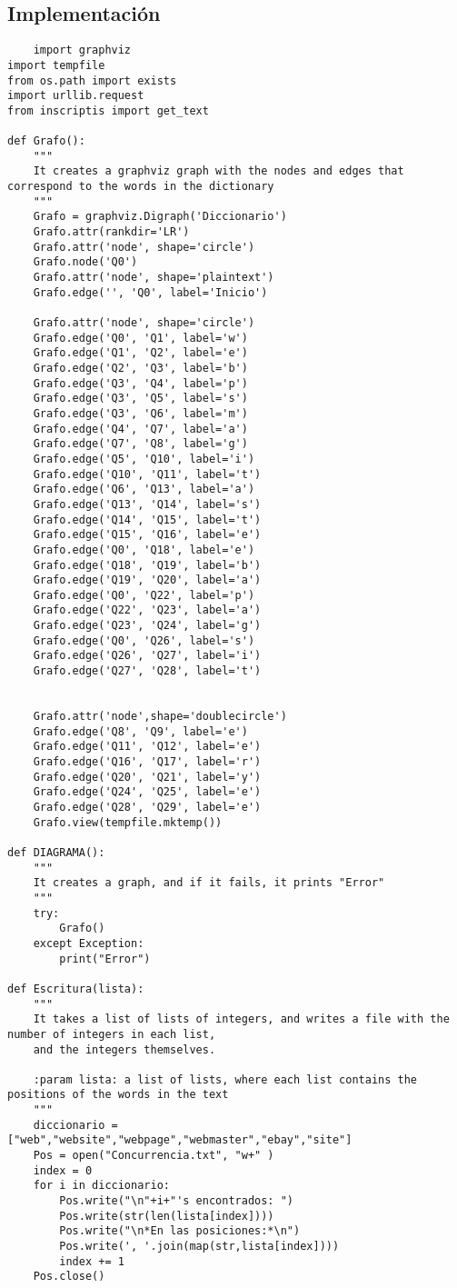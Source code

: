 \documentclass{article}
\begin{document}
\subsection{Implementaci\'on}
\begin{lstlisting}
    import graphviz
import tempfile
from os.path import exists
import urllib.request
from inscriptis import get_text

def Grafo():
    """
    It creates a graphviz graph with the nodes and edges that correspond to the words in the dictionary
    """
    Grafo = graphviz.Digraph('Diccionario')
    Grafo.attr(rankdir='LR')
    Grafo.attr('node', shape='circle')
    Grafo.node('Q0')
    Grafo.attr('node', shape='plaintext')
    Grafo.edge('', 'Q0', label='Inicio')

    Grafo.attr('node', shape='circle')
    Grafo.edge('Q0', 'Q1', label='w')
    Grafo.edge('Q1', 'Q2', label='e')
    Grafo.edge('Q2', 'Q3', label='b')
    Grafo.edge('Q3', 'Q4', label='p')
    Grafo.edge('Q3', 'Q5', label='s')
    Grafo.edge('Q3', 'Q6', label='m')
    Grafo.edge('Q4', 'Q7', label='a')
    Grafo.edge('Q7', 'Q8', label='g')
    Grafo.edge('Q5', 'Q10', label='i')
    Grafo.edge('Q10', 'Q11', label='t')
    Grafo.edge('Q6', 'Q13', label='a')
    Grafo.edge('Q13', 'Q14', label='s')
    Grafo.edge('Q14', 'Q15', label='t')
    Grafo.edge('Q15', 'Q16', label='e')
    Grafo.edge('Q0', 'Q18', label='e')
    Grafo.edge('Q18', 'Q19', label='b')
    Grafo.edge('Q19', 'Q20', label='a')
    Grafo.edge('Q0', 'Q22', label='p')
    Grafo.edge('Q22', 'Q23', label='a')
    Grafo.edge('Q23', 'Q24', label='g')
    Grafo.edge('Q0', 'Q26', label='s')
    Grafo.edge('Q26', 'Q27', label='i')
    Grafo.edge('Q27', 'Q28', label='t')
    

    Grafo.attr('node',shape='doublecircle')
    Grafo.edge('Q8', 'Q9', label='e')
    Grafo.edge('Q11', 'Q12', label='e')
    Grafo.edge('Q16', 'Q17', label='r')
    Grafo.edge('Q20', 'Q21', label='y')
    Grafo.edge('Q24', 'Q25', label='e')
    Grafo.edge('Q28', 'Q29', label='e')
    Grafo.view(tempfile.mktemp())

def DIAGRAMA():
    """
    It creates a graph, and if it fails, it prints "Error"
    """
    try:
        Grafo()
    except Exception:
        print("Error")
        
def Escritura(lista):
    """
    It takes a list of lists of integers, and writes a file with the number of integers in each list,
    and the integers themselves.
    
    :param lista: a list of lists, where each list contains the positions of the words in the text
    """
    diccionario = ["web","website","webpage","webmaster","ebay","site"]
    Pos = open("Concurrencia.txt", "w+" )
    index = 0
    for i in diccionario:
        Pos.write("\n"+i+"'s encontrados: ")
        Pos.write(str(len(lista[index])))
        Pos.write("\n*En las posiciones:*\n")
        Pos.write(', '.join(map(str,lista[index])))
        index += 1
    Pos.close()


\end{lstlisting}
\end{document}
